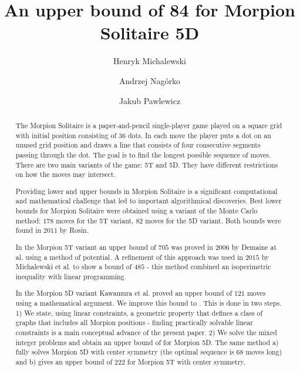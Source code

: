 \documentclass[a4paper,UKenglish]{lipics}
\title{{An upper bound of 84 for Morpion Solitaire 5D}}%
\author[1]{Henryk Michalewski}
\author[1]{Andrzej Nagórko}
\author[1]{Jakub Pawlewicz}
\affil[1]{Department of Mathematics, Informatics and Mechanics\\ University of Warsaw\\ \{H.Michalewski,A.Nagorko,J.Pawlewicz\}@mimuw.edu.pl} %
\begin{document}
\maketitle

\begin{abstract} 
The Morpion Solitaire is a paper-and-pencil single-player game played on a square grid with initial position consisting of $36$ dots.
In each move the player puts a dot on an unused grid position and draws a line that 
  consists of four consecutive segments passing through the dot.
 The goal is to find the longest possible sequence of moves.
There are two main variants of the game: 5T and 5D. 
They have different restrictions on how the moves may intersect.

Providing lower and upper bounds in Morpion Solitaire is a significant computational and mathematical challenge
  that led to important algorithmical discoveries.
 Best lower bounds for Morpion Solitaire were obtained using a variant of the Monte Carlo method: 
 $178$ moves for the 5T variant, $82$ moves for the 5D variant.
 Both bounds were found in $2011$ by Rosin. 
 
 In the Morpion 5T variant an upper bound of $705$ was proved in $2006$ by Demaine at al. using a method of potential. 
A refinement of this approach was used in $2015$  by Michalewski et al. to show a bound of $485$ - this method combined an isoperimetric inequality with linear programming. 

In the Morpion 5D variant 
Kawamura et al. proved an upper bound of $121$ moves using a mathematical argument. 
We improve this bound to \therecord. 
This is done in two steps.
1) We state, using linear constraints, a geometric property that defines a class of graphs that includes all Morpion  positions - finding practically solvable linear constraints is a main conceptual advance of the present paper.
2) We solve the mixed integer problems and obtain 
an upper bound of \therecord for Morpion 5D. The same method a) fully solves Morpion 5D with center symmetry (the optimal sequence is $68$ moves long) and b) gives an upper bound of $222$ for Morpion 5T with center symmetry. 
\end{abstract}
\end{document}
